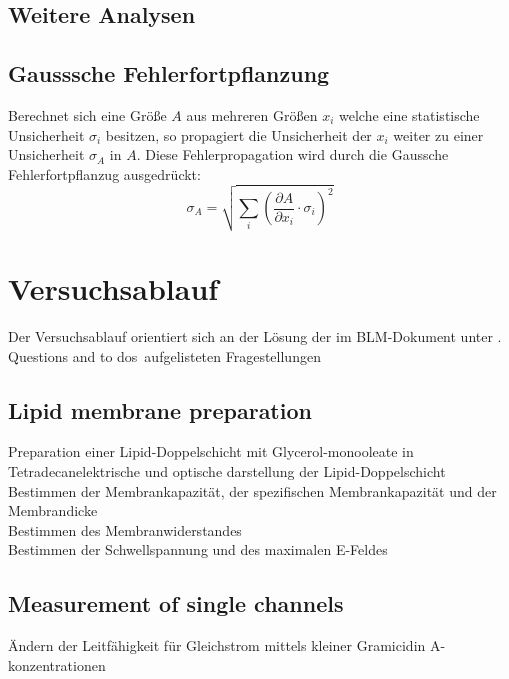 \documentclass{include/thesisclass3}
\newcommand{\cc}{\cdot}
\newcommand{\p}{\partial}
\begin{document}
\section{Weitere Analysen}




\section{Gausssche Fehlerfortpflanzung}
Berechnet sich eine Größe $A$ aus mehreren Größen $x_i$ welche eine statistische Unsicherheit $\sigma_i$ besitzen, so propagiert die Unsicherheit der $x_i$ weiter zu einer Unsicherheit $\sigma_A$ in $A$. Diese Fehlerpropagation wird durch die Gaussche Fehlerfortpflanzug ausgedrückt:
\begin{equation}
\sigma_A = \sqrt{\sum_i \left( \frac{\p A}{\p x_i} \cc \sigma_i \right)^2 }
\label{gauss}
\end{equation}




\chapter{Versuchsablauf}
Der Versuchsablauf orientiert sich an der Lösung der im BLM-Dokument unter . Questions and to dos\grqq  ~aufgelisteten Fragestellungen
\section{Lipid membrane preparation}

Preparation einer Lipid-Doppelschicht mit Glycerol-monooleate in Tetradecanelektrische und optische darstellung der Lipid-Doppelschicht\\

Bestimmen der Membrankapazität, der spezifischen Membrankapazität und der Membrandicke\\ 

Bestimmen des Membranwiderstandes\\ 

Bestimmen der Schwellspannung und des maximalen E-Feldes

\section{Measurement of single channels}
Ändern der Leitfähigkeit für Gleichstrom mittels kleiner Gramicidin A-konzentrationen\\
\end{document}
